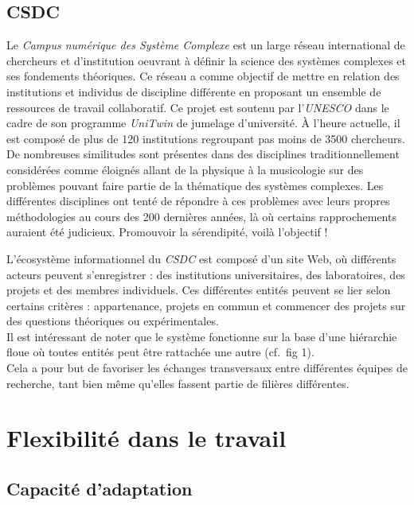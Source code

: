 \documentclass[french, 11pt]{memoir}
\begin{document}
\subsection{CSDC}\label{csdc}
Le \emph{Campus numérique des
	Système Complexe} est un large réseau international de chercheurs et
d'institution oeuvrant à définir la science des systèmes complexes et
ses fondements théoriques. Ce réseau a comme objectif de mettre en
relation des institutions et individus de discipline différente en
proposant un ensemble de ressources de travail collaboratif. Ce projet
est soutenu par l'\emph{UNESCO} dans le cadre de son programme
\emph{UniTwin} de jumelage d'université. À l'heure actuelle, il est
composé de plus de 120 institutions regroupant pas moins de 3500
chercheurs. \\ 
De nombreuses similitudes sont présentes dans des disciplines
traditionnellement considérées comme éloignés allant de la physique à la
musicologie sur des problèmes pouvant faire partie de la thématique des
systèmes complexes. Les différentes disciplines ont tenté de répondre à
ces problèmes avec leurs propres méthodologies au cours des 200
dernières années, là où certains rapprochements auraient été judicieux.
Promouvoir la sérendipité, voilà l'objectif !

\bigskip
L'écosystème informationnel du \emph{CSDC} est composé d'un site Web, où
différents acteurs peuvent s'enregistrer : des institutions
universitaires, des laboratoires, des projets et des membres
individuels. Ces différentes entités peuvent se lier selon certains
critères : appartenance, projets en commun et commencer des projets sur
des questions théoriques ou expérimentales. \\
Il est intéressant de noter que le système fonctionne sur la base d'une hiérarchie floue où toutes
entités peut être rattachée une autre (cf.~fig 1). \\
Cela a pour but de favoriser les échanges transversaux entre différentes
équipes de recherche, tant bien même qu'elles fassent partie de filières
différentes.

\section{Flexibilité dans le
	travail}\label{flexibilituxe9-dans-le-travail}

\subsection{Capacité d'adaptation}\label{capacituxe9-dadaptation}
\end{document}
